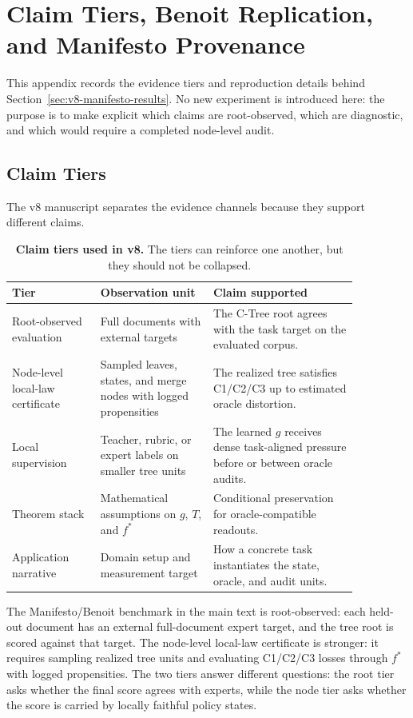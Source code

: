 \section{Claim Tiers, Benoit Replication, and Manifesto Provenance}
\label{app:v8-claim-tiers-manifesto}
\label{app:v8-benoit-replication}

This appendix records the evidence tiers and reproduction details behind
Section~\ref{sec:v8-manifesto-results}. No new experiment is introduced here:
the purpose is to make explicit which claims are root-observed, which are
diagnostic, and which would require a completed node-level audit.

\subsection{Claim Tiers}

The v8 manuscript separates the evidence channels because they support
different claims.

\begin{table}[t]
\centering
\small
\begin{tabular}{@{}p{0.22\linewidth}p{0.28\linewidth}p{0.36\linewidth}@{}}
\toprule
Tier & Observation unit & Claim supported \\
\midrule
Root-observed evaluation & Full documents with external targets &
The C-Tree root agrees with the task target on the evaluated corpus. \\
Node-level local-law certificate & Sampled leaves, states, and merge nodes
with logged propensities &
The realized tree satisfies C1/C2/C3 up to estimated oracle distortion. \\
Local supervision & Teacher, rubric, or expert labels on smaller tree units &
The learned \(g\) receives dense task-aligned pressure before or between
oracle audits. \\
Theorem stack & Mathematical assumptions on \(g\), \(T\), and \(f^\ast\) &
Conditional preservation for oracle-compatible readouts. \\
Application narrative & Domain setup and measurement target &
How a concrete task instantiates the state, oracle, and audit units. \\
\bottomrule
\end{tabular}
\caption{\textbf{Claim tiers used in v8.} The tiers can reinforce one another,
but they should not be collapsed.}
\label{tab:v8-claim-tiers}
\end{table}

The Manifesto/Benoit benchmark in the main text is root-observed: each held-out
document has an external full-document expert target, and the tree root is
scored against that target. The node-level local-law certificate is stronger:
it requires sampling realized tree units and evaluating C1/C2/C3 losses through
\(f^\ast\) with logged propensities. The two tiers answer different questions:
the root tier asks whether the final score agrees with experts, while the node
tier asks whether the score is carried by locally faithful policy states.

